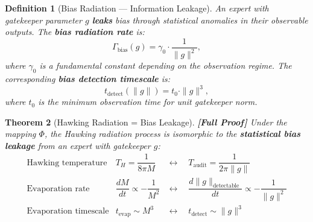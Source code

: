 \documentclass[12pt,a4paper]{article}
\newtheorem{theorem}{Theorem}[section]
\newtheorem{definition}[theorem]{Definition}
\theoremstyle{remark}
\newcommand{\rigorFull}{\textbf{[Full Proof]}}
\begin{document}
\begin{definition}[Bias Radiation — Information Leakage]
\label{def:bias_radiation}
An expert with gatekeeper parameter $g$ \textbf{leaks} bias through statistical anomalies in their observable outputs. The \textbf{bias radiation rate} is:
\begin{equation}
  \label{eq:bias_radiation}
  \Gamma_{\text{bias}}(g) = \gamma_0 \cdot \frac{1}{\|g\|^2},
\end{equation}
where $\gamma_0$ is a fundamental constant depending on the observation regime. The corresponding \textbf{bias detection timescale} is:
\begin{equation}
  t_{\text{detect}}(\|g\|) = t_0 \cdot \|g\|^3,
\end{equation}
where $t_0$ is the minimum observation time for unit gatekeeper norm.
\end{definition}

\begin{theorem}[Hawking Radiation = Bias Leakage]
\label{thm:hawking_bias}
\rigorFull
Under the mapping $\Phi$, the Hawking radiation process is isomorphic to the \textbf{statistical bias leakage} from an expert with gatekeeper $g$:
\begin{equation}
  \begin{array}{ccc}
    \text{Hawking temperature} & T_H = \dfrac{1}{8\pi M} & \longleftrightarrow \quad T_{\text{audit}} = \dfrac{1}{2\pi \|g\|} \\[8pt]
    \text{Evaporation rate} & \dfrac{dM}{dt} \propto -\dfrac{1}{M^2} & \longleftrightarrow \quad \dfrac{d\|g\|_{\text{detectable}}}{dt} \propto -\dfrac{1}{\|g\|^2} \\[8pt]
    \text{Evaporation timescale} & t_{\text{evap}} \sim M^3 & \longleftrightarrow \quad t_{\text{detect}} \sim \|g\|^3
  \end{array}
\end{equation}
\end{theorem}
\end{document}

